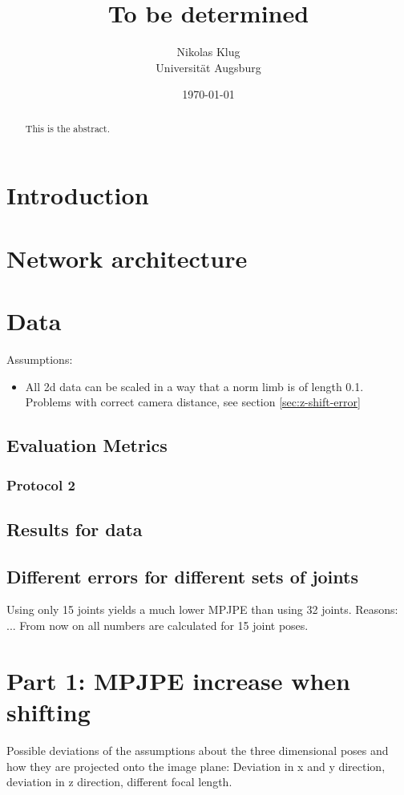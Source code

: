 \documentclass[11pt]{article}
\author{Nikolas Klug \\ Universität Augsburg}
\date{\today}
\title{To be determined}
\begin{document}
	\maketitle
	\newpage
	\begin{abstract}
		This is the abstract.
	\end{abstract}
	\newpage
	\tableofcontents
	\newpage
	\section{Introduction}
	\section{Network architecture}
	\section{Data}
	Assumptions:
	\begin{itemize}
		\item All 2d data can be scaled in a way that a norm limb is of length 0.1. 
		Problems with correct camera distance, see section \ref{sec:z-shift-error}
	\end{itemize}
	\subsection{Evaluation Metrics}
	\subsubsection{Protocol 2}\label{sec:protocol2}
	\subsection{Results for data}
	\subsection{Different errors for different sets of joints}
		Using only 15 joints yields a much lower MPJPE than using 32 joints. Reasons: ...	
		From now on all numbers are calculated for 15 joint poses.
	\section{Part 1: MPJPE increase when shifting}
	
	Possible deviations of the assumptions about the three dimensional poses and how they are projected onto the image plane: Deviation in x and y direction, deviation in z direction, different focal length.
	
\end{document}
